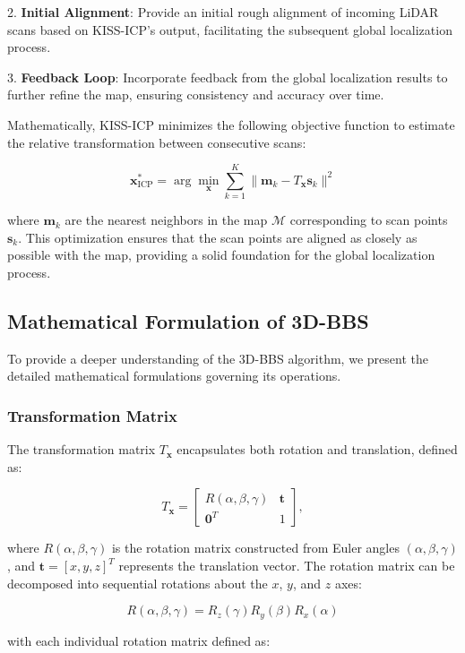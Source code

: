 2. \textbf{Initial Alignment}: Provide an initial rough alignment of incoming LiDAR scans based on KISS-ICP's output, facilitating the subsequent global localization process.

3. \textbf{Feedback Loop}: Incorporate feedback from the global localization results to further refine the map, ensuring consistency and accuracy over time.

Mathematically, KISS-ICP minimizes the following objective function to estimate the relative transformation between consecutive scans:

$$\mathbf{x}_{\text{ICP}}^* = \arg\min_{\mathbf{x}} \sum_{k=1}^{K} \|\mathbf{m}_k - T_{\mathbf{x}}\mathbf{s}_k\|^2$$

where $\mathbf{m}_k$ are the nearest neighbors in the map $\mathcal{M}$ corresponding to scan points $\mathbf{s}_k$. This optimization ensures that the scan points are aligned as closely as possible with the map, providing a solid foundation for the global localization process.

\subsection{Mathematical Formulation of 3D-BBS}
To provide a deeper understanding of the 3D-BBS algorithm, we present the detailed mathematical formulations governing its operations.

\subsubsection{Transformation Matrix}
The transformation matrix $T_{\mathbf{x}}$ encapsulates both rotation and translation, defined as:

\begin{equation*}
T_{\mathbf{x}} = \begin{bmatrix}
R(\alpha, \beta, \gamma) & \mathbf{t} \\
\mathbf{0}^T & 1
\end{bmatrix},
\end{equation*}

where $R(\alpha, \beta, \gamma)$ is the rotation matrix constructed from Euler angles $(\alpha, \beta, \gamma)$, and $\mathbf{t} = [x, y, z]^T$ represents the translation vector. The rotation matrix can be decomposed into sequential rotations about the $x$, $y$, and $z$ axes:

$$R(\alpha, \beta, \gamma) = R_z(\gamma) R_y(\beta) R_x(\alpha)$$

with each individual rotation matrix defined as:

